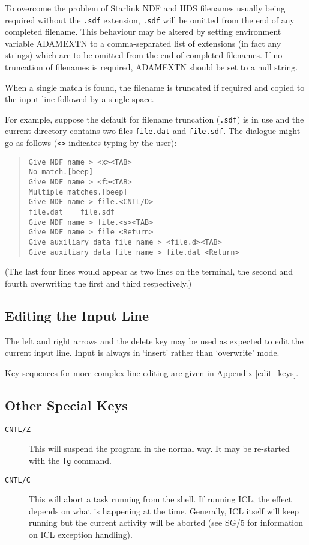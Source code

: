 \documentclass[twoside,11pt]{article}
\newcommand{\xref}[3]{#1}
\newcommand{\xlabel}[1]{}
\renewcommand{\_}{\texttt{\symbol{95}}}
\begin{document}
To overcome the problem of Starlink NDF and HDS filenames usually being 
required without the \texttt{.sdf} extension, \texttt{.sdf} will be omitted 
from the end of any completed filename.
This behaviour may be altered by setting environment variable 
ADAM\_EXTN to a comma-separated list of extensions (in fact any strings) 
which are to be omitted from the end of completed filenames.
If no truncation of filenames is required, ADAM\_EXTN should be set to a null 
string.

When a single match is found, the filename is truncated if required and copied 
to the input line followed by a single space.

For example, suppose the default for filename truncation (\texttt{.sdf}) is in
use and the  current directory contains two files \texttt{file.dat} and 
\texttt{file.sdf}.
The dialogue might go as follows (\verb!<>! indicates typing by the user):
\small
\begin{quote} \begin{verbatim}
Give NDF name > <x><TAB>
No match.[beep]
Give NDF name > <f><TAB>
Multiple matches.[beep]
Give NDF name > file.<CNTL/D>
file.dat    file.sdf
Give NDF name > file.<s><TAB>
Give NDF name > file <Return>
Give auxiliary data file name > <file.d><TAB>
Give auxiliary data file name > file.dat <Return>
\end{verbatim} \end{quote}
\normalsize
(The last four lines would appear as two lines on the terminal, the second and
fourth overwriting the first and third respectively.)

\subsection{Editing the Input Line}
The left and right arrows and the delete key may be used as expected to edit the
current input line. Input is always in `insert' rather than `overwrite' mode.

Key sequences for more complex line editing are given in Appendix
\ref{edit_keys}.

\subsection{\xlabel{other_special_keys}\label{other_special_keys}Other Special Keys}
\begin{description}
\item[\texttt{CNTL/Z}] This will suspend the program in the normal way. It may
be re-started with the \texttt{fg} command.
\item[\texttt{CNTL/C}] 
This will abort a task running from the shell.
If running ICL, the effect depends on what is happening at the time.
Generally, ICL itself will keep running but the current activity will be 
aborted (see 
\xref{SG/5}{sg5}{errors_and_exceptions}
for information on ICL exception handling).
\end{description}
\end{document}

